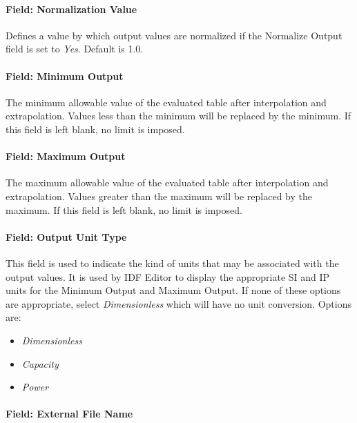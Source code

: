 \paragraph{Field: Normalization Value}\label{field-normalization-value}

Defines a value by which output values are normalized if the Normalize Output
field is set to \emph{Yes}. Default is 1.0.

\paragraph{Field: Minimum Output}\label{field-minimum-output}

The minimum allowable value of the evaluated table after interpolation
and extrapolation. Values less than the minimum will be replaced by the
minimum. If this field is left blank, no limit is imposed.

\paragraph{Field: Maximum Output}\label{field-maximum-output}

The maximum allowable value of the evaluated table after interpolation
and extrapolation. Values greater than the maximum will be replaced by
the maximum. If this field is left blank, no limit is imposed.

\paragraph{Field: Output Unit Type}\label{field-output-unit-type}

This field is used to indicate the kind of units that may be associated
with the output values. It is used by IDF Editor to display the
appropriate SI and IP units for the Minimum Output and Maximum Output.
If none of these options are appropriate, select \emph{Dimensionless}
which will have no unit conversion. Options are:

\begin{itemize}
  \tightlist
  \item
  \emph{Dimensionless}
  \item
  \emph{Capacity}
  \item
  \emph{Power}
\end{itemize}

\paragraph{Field: External File
Name}\label{field-external-file-name}

